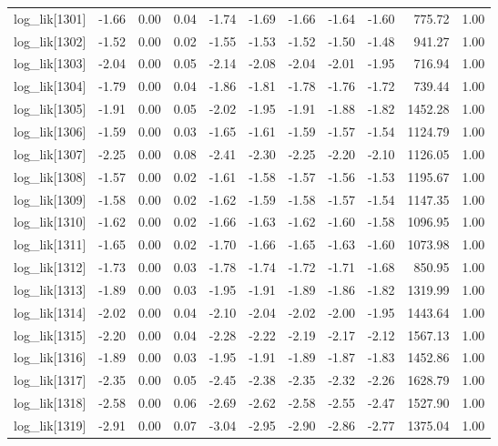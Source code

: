 \begin{table}[ht]
\begin{tabular}{rrrrrrrrrrr}
  log\_lik[1301] & -1.66 & 0.00 & 0.04 & -1.74 & -1.69 & -1.66 & -1.64 & -1.60 & 775.72 & 1.00 \\ 
  log\_lik[1302] & -1.52 & 0.00 & 0.02 & -1.55 & -1.53 & -1.52 & -1.50 & -1.48 & 941.27 & 1.00 \\ 
  log\_lik[1303] & -2.04 & 0.00 & 0.05 & -2.14 & -2.08 & -2.04 & -2.01 & -1.95 & 716.94 & 1.00 \\ 
  log\_lik[1304] & -1.79 & 0.00 & 0.04 & -1.86 & -1.81 & -1.78 & -1.76 & -1.72 & 739.44 & 1.00 \\ 
  log\_lik[1305] & -1.91 & 0.00 & 0.05 & -2.02 & -1.95 & -1.91 & -1.88 & -1.82 & 1452.28 & 1.00 \\ 
  log\_lik[1306] & -1.59 & 0.00 & 0.03 & -1.65 & -1.61 & -1.59 & -1.57 & -1.54 & 1124.79 & 1.00 \\ 
  log\_lik[1307] & -2.25 & 0.00 & 0.08 & -2.41 & -2.30 & -2.25 & -2.20 & -2.10 & 1126.05 & 1.00 \\ 
  log\_lik[1308] & -1.57 & 0.00 & 0.02 & -1.61 & -1.58 & -1.57 & -1.56 & -1.53 & 1195.67 & 1.00 \\ 
  log\_lik[1309] & -1.58 & 0.00 & 0.02 & -1.62 & -1.59 & -1.58 & -1.57 & -1.54 & 1147.35 & 1.00 \\ 
  log\_lik[1310] & -1.62 & 0.00 & 0.02 & -1.66 & -1.63 & -1.62 & -1.60 & -1.58 & 1096.95 & 1.00 \\ 
  log\_lik[1311] & -1.65 & 0.00 & 0.02 & -1.70 & -1.66 & -1.65 & -1.63 & -1.60 & 1073.98 & 1.00 \\ 
  log\_lik[1312] & -1.73 & 0.00 & 0.03 & -1.78 & -1.74 & -1.72 & -1.71 & -1.68 & 850.95 & 1.00 \\ 
  log\_lik[1313] & -1.89 & 0.00 & 0.03 & -1.95 & -1.91 & -1.89 & -1.86 & -1.82 & 1319.99 & 1.00 \\ 
  log\_lik[1314] & -2.02 & 0.00 & 0.04 & -2.10 & -2.04 & -2.02 & -2.00 & -1.95 & 1443.64 & 1.00 \\ 
  log\_lik[1315] & -2.20 & 0.00 & 0.04 & -2.28 & -2.22 & -2.19 & -2.17 & -2.12 & 1567.13 & 1.00 \\ 
  log\_lik[1316] & -1.89 & 0.00 & 0.03 & -1.95 & -1.91 & -1.89 & -1.87 & -1.83 & 1452.86 & 1.00 \\ 
  log\_lik[1317] & -2.35 & 0.00 & 0.05 & -2.45 & -2.38 & -2.35 & -2.32 & -2.26 & 1628.79 & 1.00 \\ 
  log\_lik[1318] & -2.58 & 0.00 & 0.06 & -2.69 & -2.62 & -2.58 & -2.55 & -2.47 & 1527.90 & 1.00 \\ 
  log\_lik[1319] & -2.91 & 0.00 & 0.07 & -3.04 & -2.95 & -2.90 & -2.86 & -2.77 & 1375.04 & 1.00 \\ 

\end{tabular}
\end{table}
